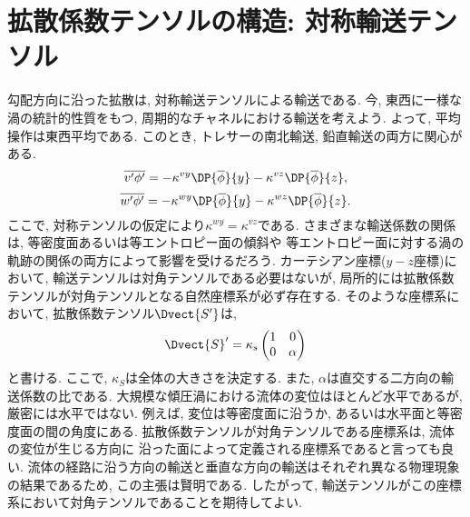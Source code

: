 \section{拡散係数テンソルの構造: 対称輸送テンソル}
勾配方向に沿った拡散は, 対称輸送テンソルによる輸送である. 
今, 東西に一様な渦の統計的性質をもつ, 周期的なチャネルにおける輸送を考えよう. 
よって, 平均操作は東西平均である. 
このとき, トレサーの南北輸送, 鉛直輸送の両方に関心がある. 
\begin{equation}
  \overline{v' \phi'} = - \kappa^{vy} \DP{\overline{\phi}}{y}
                        - \kappa^{vz} \DP{\overline{\phi}}{z}, 
\end{equation}
\begin{equation}
  \overline{w' \phi'} = - \kappa^{wy} \DP{\overline{\phi}}{y}
                        - \kappa^{wz} \DP{\overline{\phi}}{z}. 
\end{equation}
ここで, 対称テンソルの仮定により$\kappa^{wy} = \kappa^{vz}$である. 
さまざまな輸送係数の関係は, 等密度面あるいは等エントロピー面の傾斜や
等エントロピー面に対する渦の軌跡の関係の両方によって影響を受けるだろう. 
カーテシアン座標($y-z$座標)において, 輸送テンソルは対角テンソルである必要はないが, 
局所的には拡散係数テンソルが対角テンソルとなる自然座標系が必ず存在する. 
そのような座標系において, 拡散係数テンソル$\Dvect{S'}$は, 
\begin{equation}
  \Dvect{S}' = \kappa_s
\begin{pmatrix}
    1 &0  \\
    0 &\alpha
  \end{pmatrix}
\end{equation}
と書ける. 
ここで, $\kappa_S$は全体の大きさを決定する. 
また, $\alpha$は直交する二方向の輸送係数の比である. 
大規模な傾圧渦における流体の変位はほとんど水平であるが, 厳密には水平ではない. 
例えば, 変位は等密度面に沿うか, あるいは水平面と等密度面の間の角度にある. 
拡散係数テンソルが対角テンソルである座標系は, 流体の変位が生じる方向に
沿った面によって定義される座標系であると言っても良い. 
流体の経路に沿う方向の輸送と垂直な方向の輸送はそれぞれ異なる物理現象の結果であるため, 
この主張は賢明である. 
したがって, 輸送テンソルがこの座標系において対角テンソルであることを期待してよい. 

